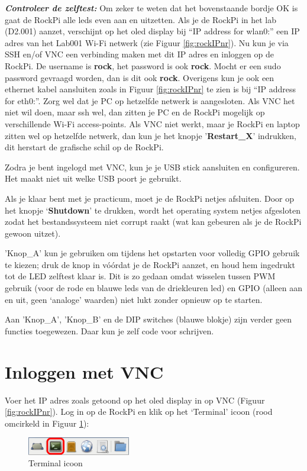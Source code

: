 \textbf{\textit{Controleer de zelftest:}} Om zeker te weten dat het bovenstaande bordje OK is gaat de RockPi alle leds even aan en uitzetten. \newline
Als je de RockPi in het lab (D2.001) aanzet, verschijnt op het oled display bij “IP address for wlan0:” een IP adres van het Lab001 Wi-Fi netwerk (zie Figuur \ref{fig:rockIPnr}). \newline
Nu kun je via SSH en/of VNC een verbinding maken met dit IP adres en inloggen op de RockPi.
De username is \textbf{rock}, het password is ook \textbf{rock}. Mocht er een sudo password gevraagd worden, dan is dit ook \textbf{rock}.
Overigens kun je ook een ethernet kabel aansluiten zoals in Figuur \ref{fig:rockIPnr} te zien is bij “IP address for eth0:”.\break\newline
Zorg wel dat je PC op hetzelfde netwerk is aangesloten. Als VNC het niet wil doen, maar ssh wel, dan zitten je PC en de RockPi mogelijk op verschillende Wi-Fi access-points. Als VNC niet werkt, maar je RockPi en laptop zitten wel op hetzelfde netwerk, dan kun je het knopje '\textbf{Restart\_X}' indrukken, dit herstart de grafische schil op de RockPi.

Zodra je bent ingelogd met VNC, kun je je USB stick aansluiten en configureren. Het maakt niet uit welke USB poort je gebruikt. 

Als je klaar bent met je practicum, moet je de RockPi netjes afsluiten. Door op het knopje ‘\textbf{Shutdown}’ te drukken, wordt het operating system netjes afgesloten zodat het bestandssysteem niet corrupt raakt (wat kan gebeuren als je de RockPi gewoon uitzet).

'Knop\_A' kun je gebruiken om tijdens het opstarten voor volledig GPIO gebruik te kiezen; druk de knop in vóórdat je de RockPi aanzet, en houd hem ingedrukt tot de LED zelftest klaar is. Dit is zo gedaan omdat wisselen tussen PWM gebruik (voor de rode en blauwe leds van de driekleuren led) en GPIO (alleen aan en uit, geen ‘analoge’ waarden) niet lukt zonder opnieuw op te starten.

Aan 'Knop\_A', 'Knop\_B' en de DIP switches (blauwe blokje) zijn verder geen functies toegewezen. Daar kun je zelf code voor schrijven.

\section{Inloggen met VNC}
Voer het IP adres zoals getoond op het oled display in op VNC (Figuur \ref{fig:rockIPnr}).\newline
Log in op de RockPi en klik op het ‘Terminal’ icoon (rood omcirkeld in Figuur \ref{fig:termico}):
\begin{figure}[h!]
	\centering
	\begin{center} 	
		\includegraphics[width=0.4\textwidth]{figuren/Terminal-icoon}
		\caption{Terminal icoon}
		\label{fig:termico}   
	\end{center}
\end{figure}


